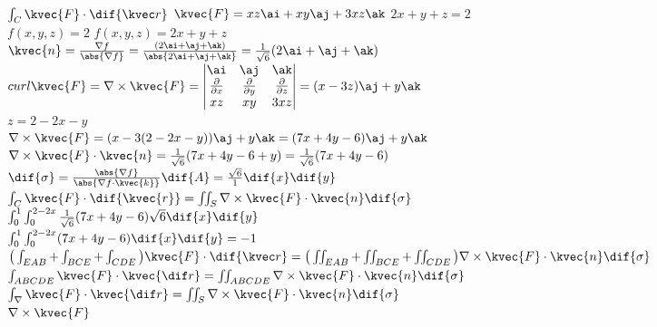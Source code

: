 
\(\int_{C}\kvec{F}\cdot\dif{\kvec r}\)
\(\kvec{F}=xz\ai+xy\aj+3xz\ak\)
\(2x+y+z=2\)\\


\(f(x,y,z)=2\)
\(f(x,y,z)=2x+y+z\)\\
\(\kvec{n}=\frac{\nabla f}{\abs{\nabla f}}=\frac{(2\ai+\aj+\ak)}{\abs{2\ai+\aj+\ak}}=\frac{1}{\sqrt{6}}(2\ai+\aj+\ak)\)\\
\(curl\kvec{F}=\nabla\times\kvec{F}=\begin{vmatrix}
\ai&\aj&\ak\\
\frac{\partial}{\partial x}&\frac{\partial}{\partial y}&\frac{\partial}{\partial z}\\
xz&xy&3xz
\end{vmatrix}=(x-3z)\aj+y\ak\)\\

\(z=2-2x-y\)\\
\(\nabla\times\kvec{F}=(x-3(2-2x-y))\aj+y\ak=(7x+4y-6)\aj+y\ak\)\\
\(\nabla\times\kvec{F}\cdot\kvec{n}=\frac{1}{\sqrt{6}}(7x+4y-6+y)=\frac{1}{\sqrt{6}}(7x+4y-6)\)\\
\(\dif{\sigma}=\frac{\abs{\nabla f}}{\abs{\nabla f\cdot\kvec{k}}}\dif{A}=\frac{\sqrt{6}}{1}\dif{x}\dif{y}\)\\
\(\int_{C}\kvec{F}\cdot\dif{\kvec{r}}=\iint_{S}\nabla\times\kvec{F}\cdot\kvec{n}\dif{\sigma}\)\\
\(\int_{0}^{1}\int_{0}^{2-2x}\frac{1}{\sqrt{6}}(7x+4y-6)\sqrt{6}\dif{x}\dif{y}\)\\
\(\int_{0}^{1}\int_{0}^{2-2x}(7x+4y-6)\dif{x}\dif{y}=-1\)\\


\(\big(\int_{EAB}+\int_{BCE}+\int_{CDE}\big)\kvec{F}\cdot\dif{\kvec r}=\big(\iint_{EAB}+\iint_{BCE}+\iint_{CDE}\big)\nabla\times\kvec{F}\cdot\kvec{n}\dif{\sigma}\)\\
\(\int_{ABCDE}\kvec{F}\cdot\kvec{\dif r}=\iint_{ABCDE}\nabla\times\kvec{F}\cdot\kvec{n}\dif{\sigma}\)\\
\(\int_{\nabla}\kvec{F}\cdot\kvec{\dif r}=\iint_{S}\nabla\times\kvec{F}\cdot\kvec{n}\dif{\sigma}\)\\



\(\nabla\times\kvec{F}\)\\


